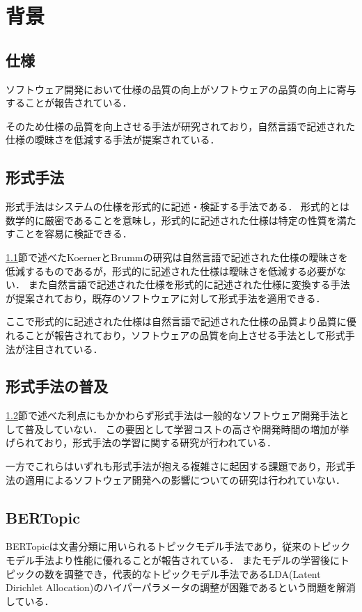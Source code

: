 \documentclass[main]{subfiles}
\begin{document}
\chapter{背景}

\section{仕様}
\label{sec:specification}

ソフトウェア開発において仕様の品質の向上がソフトウェアの品質の向上に寄与することが報告されている\cite{knauss:2009}．

そのため仕様の品質を向上させる手法が研究されており，自然言語で記述された仕様の曖昧さを低減する手法が提案されている\cite{koerner:2011}．

\section{形式手法}
\label{sec:formal-method}

形式手法はシステムの仕様を形式的に記述・検証する手法である．
形式的とは数学的に厳密であることを意味し，形式的に記述された仕様は特定の性質を満たすことを容易に検証できる．

\ref{sec:specification}節で述べたKoernerとBrummの研究は自然言語で記述された仕様の曖昧さを低減するものであるが，形式的に記述された仕様は曖昧さを低減する必要がない．
また自然言語で記述された仕様を形式的に記述された仕様に変換する手法が提案されており\cite{ilieva:2005}，既存のソフトウェアに対して形式手法を適用できる．

ここで形式的に記述された仕様は自然言語で記述された仕様の品質より品質に優れることが報告されており\cite{fabbrini:2001}，ソフトウェアの品質を向上させる手法として形式手法が注目されている．%

\section{形式手法の普及}

\ref{sec:formal-method}節で述べた利点にもかかわらず形式手法は一般的なソフトウェア開発手法として普及していない．
この要因として学習コストの高さ\cite{kurita:2011}や開発時間の増加\cite{kitamura:2021}が挙げられており，形式手法の学習に関する研究が行われている\cite{ohnishi:2020,araki:2010,araki:2011}．

一方でこれらはいずれも形式手法が抱える複雑さに起因する課題であり，形式手法の適用によるソフトウェア開発への影響についての研究は行われていない．

\section{BERTopic}

BERTopicは文書分類に用いられるトピックモデル手法であり，従来のトピックモデル手法より性能に優れることが報告されている\cite{egger:2022}．
またモデルの学習後にトピックの数を調整でき，代表的なトピックモデル手法であるLDA(Latent Dirichlet Allocation)のハイパーパラメータの調整が困難であるという問題を解消している．
\end{document}
